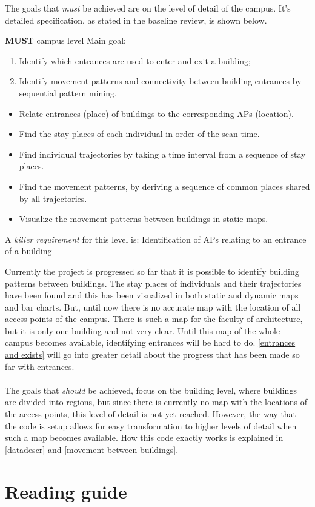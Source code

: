 The goals that \textit{must} be achieved are on the level of detail of the campus. It’s detailed specification, as stated in the baseline review, is shown below. 

\textbf{MUST} campus level
Main goal: 
\begin{enumerate}
\item Identify which entrances are used to enter and exit a building;
\item Identify movement patterns and connectivity between building entrances by sequential pattern mining.
\end{enumerate}
\begin{itemize}
\item Relate entrances (place) of buildings to the corresponding APs (location).
\item Find the stay places of each individual in order of the scan time.
\item Find individual trajectories by taking a time interval from a sequence of stay places.
\item Find the movement patterns, by deriving a sequence of common places shared by all trajectories.
\item Visualize the movement patterns between buildings in static maps.
\end{itemize}
A \textit{killer requirement} for this level is:
Identification of APs relating to an entrance of a building

Currently the project is progressed so far that it is possible to identify building patterns between buildings. The stay places of individuals and their trajectories have been found and this has been visualized in both static and dynamic maps and bar charts. But, until now there is no accurate map with the location of all access points of the campus. There is such a map for the faculty of architecture, but it is only one building and not very clear. Until this map of the whole campus becomes available, identifying entrances will be hard to do. \autoref{entrances and exists} will go into greater detail about the progress that has been made so far with entrances. \\\\
The goals that \textit {should} be achieved, focus on the building level, where buildings are divided into regions, but since there is currently no map with the locations of the access points, this level of detail is not yet reached. However, the way that the code is setup allows for easy transformation to higher levels of detail when such a map becomes available. How this code exactly works is explained in \autoref{datadescr} and \autoref{movement between buildings}. 

\section{Reading guide}

